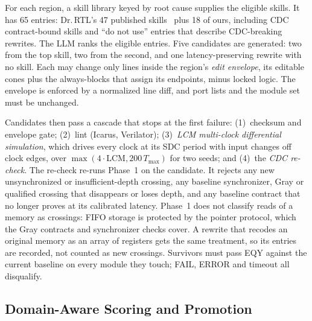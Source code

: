 \documentclass[conference,10pt]{IEEEtran}
\begin{document}
For each region, a skill library keyed by root cause supplies the eligible skills. It has 65 entries: Dr.\,RTL's 47
published skills~\cite{drrtl2026} plus 18 of ours, including CDC contract-bound skills and ``do not use'' entries
that describe CDC-breaking rewrites. The LLM ranks the eligible entries. Five candidates are generated: two from the
top skill, two from the second, and one latency-preserving rewrite with no skill. Each may change only lines inside
the region's \emph{edit envelope}, its editable cones plus the always-blocks that assign its endpoints, minus locked
logic. The envelope is enforced by a normalized line diff, and port lists and the module set must be unchanged.

Candidates then pass a cascade that stops at the first failure: (1)~checksum and envelope gate; (2)~lint (Icarus,
Verilator); (3)~\emph{LCM multi-clock differential simulation}, which drives every clock at its SDC period with
input changes off clock edges, over $\max(4\cdot\mathrm{LCM},200\,T_{\max})$ for two seeds; and (4)~the \emph{CDC
re-check}. The re-check re-runs Phase~1 on the candidate. It rejects any new unsynchronized or insufficient-depth
crossing, any baseline synchronizer, Gray or qualified crossing that disappears or loses depth, and any baseline
contract that no longer proves at its calibrated latency. Phase~1 does not classify reads of a memory as crossings:
FIFO storage is protected by the pointer protocol, which the Gray contracts and synchronizer checks cover. A rewrite
that recodes an original memory as an array of registers gets the same treatment, so its entries are recorded, not
counted as new crossings. Survivors must pass EQY against the current baseline on
every module they touch; FAIL, ERROR and timeout all disqualify.

\subsection{Domain-Aware Scoring and Promotion}
\end{document}

